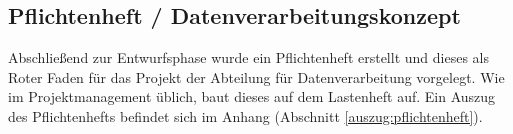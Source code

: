\subsection{Pflichtenheft / Datenverarbeitungskonzept}
Abschließend zur Entwurfsphase wurde ein Pflichtenheft erstellt und dieses als
Roter Faden für das Projekt der Abteilung für Datenverarbeitung vorgelegt. Wie im
Projektmanagement üblich, baut dieses auf dem Lastenheft auf.
Ein Auszug des Pflichtenhefts befindet sich im Anhang (Abschnitt \ref{auszug:pflichtenheft}).
